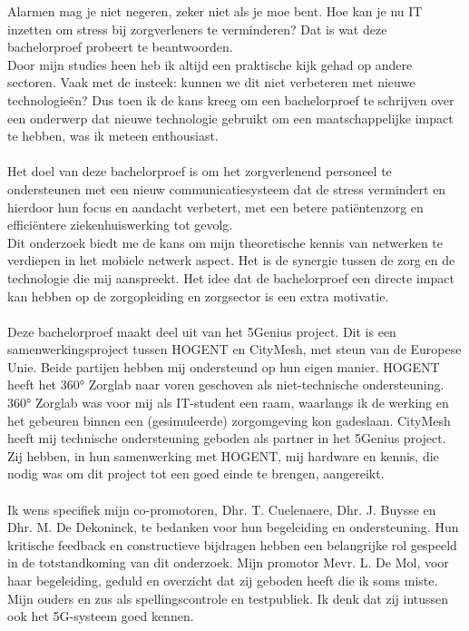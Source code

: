 Alarmen mag je niet negeren, zeker niet als je moe bent. Hoe kan je nu IT inzetten om stress bij zorgverleners te verminderen? Dat is wat deze bachelorproef probeert te beantwoorden.
\\
Door mijn studies heen heb ik altijd een praktische kijk gehad op andere sectoren. Vaak met de insteek: kunnen we dit niet verbeteren met nieuwe technologieën? Dus toen ik de kans kreeg om een bachelorproef te schrijven over een onderwerp dat nieuwe technologie gebruikt om een maatschappelijke impact te hebben, was ik meteen enthousiast.
\\\\
Het doel van deze bachelorproef is om het zorgverlenend personeel te ondersteunen met een nieuw communicatiesysteem dat de stress vermindert en hierdoor hun focus en aandacht verbetert, met een betere patiëntenzorg en efficiëntere ziekenhuiswerking tot gevolg.
\\
Dit onderzoek biedt me de kans om mijn theoretische kennis van netwerken te verdiepen in het mobiele netwerk aspect. Het is de synergie tussen de zorg en de technologie die mij aanspreekt. Het idee dat de bachelorproef een directe impact kan hebben op de zorgopleiding en zorgsector is een extra motivatie.
\\\\
Deze bachelorproef maakt deel uit van het 5Genius project. Dit is een samenwerkingsproject tussen HOGENT en CityMesh, met steun van de Europese Unie. Beide partijen hebben mij ondersteund op hun eigen manier. HOGENT heeft het 360° Zorglab naar voren geschoven als niet-technische ondersteuning. 360° Zorglab was voor mij als IT-student een raam, waarlangs ik de werking en het gebeuren binnen een (gesimuleerde) zorgomgeving kon gadeslaan. CityMesh heeft mij technische ondersteuning geboden als partner in het 5Genius project. Zij hebben, in hun samenwerking met HOGENT, mij hardware en kennis, die nodig was om dit project tot een goed einde te brengen, aangereikt.
\\\\
Ik wens specifiek mijn co-promotoren, Dhr. T. Cuelenaere, Dhr. J. Buysse en Dhr. M. De Dekoninck, te bedanken voor hun begeleiding en ondersteuning. Hun kritische feedback en constructieve bijdragen hebben een belangrijke rol gespeeld in de totstandkoming van dit onderzoek. Mijn promotor Mevr. L. De Mol, voor haar begeleiding, geduld en overzicht dat zij geboden heeft die ik soms miste.
Mijn ouders en zus als spellingscontrole en testpubliek. Ik denk dat zij intussen ook het 5G-systeem goed kennen.

